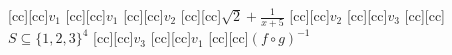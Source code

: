 [cc][cc]{$v_1$}
[cc][cc]{$v_1$}
[cc][cc]{$v_2$}
[cc][cc]{$\sqrt{2}+\frac{1}{x+5}$}
[cc][cc]{$v_2$}
[cc][cc]{$v_3$}
[cc][cc]{$S \subseteq \{1,2,3\}^4$}
[cc][cc]{$v_3$}
[cc][cc]{$v_1$}
[cc][cc]{$(f \circ g)^{-1}$}
